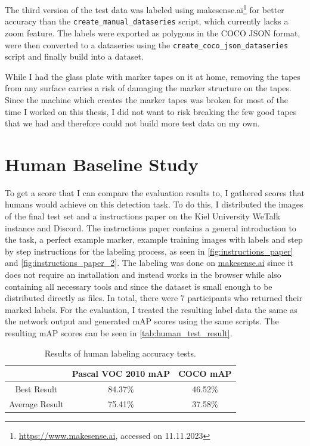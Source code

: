 \documentclass[10pt]{book}
\newcommand{\figureref}[1]{\autoref{#1}}
\begin{document}
The third version of the test data was labeled using makesense.ai\footnote{\url{https://www.makesense.ai}, accessed on 11.11.2023} for better accuracy than the \texttt{create\_manual\_dataseries} script, which currently lacks a zoom feature. The labels were exported as polygons in the \ac{COCO} \ac{JSON} format, were then converted to a dataseries using the \texttt{create\_coco\_json\_dataseries} script and finally build into a dataset.

While I had the glass plate with marker tapes on it at home, removing the tapes from any surface carries a risk of damaging the marker structure on the tapes. Since the machine which creates the marker tapes was broken for most of the time I worked on this thesis, I did not want to risk breaking the few good tapes that we had and therefore could not build more test data on my own.

\section{Human Baseline Study}

To get a score that I can compare the evaluation results to, I gathered scores that humans would achieve on this detection task. To do this, I distributed the images of the final test set and a instructions paper on the Kiel University WeTalk instance and Discord. The instructions paper contains a general introduction to the task, a perfect example marker, example training images with labels and step by step instructions for the labeling process, as seen in \figureref{fig:instructions_paper} and \figureref{fig:instructions_paper_2}. The labeling was done on \href{https://www.makesense.ai}{makesense.ai} since it does not require an installation and instead works in the browser while also containing all necessary tools and since the dataset is small enough to be distributed directly as files. In total, there were 7 participants who returned their marked labels. For the evaluation, I treated the resulting label data the same as the network output and generated \ac{mAP} scores using the same scripts. The resulting \ac{mAP} scores can be seen in \autoref{tab:human_test_result}.

\begin{table}
  \begin{tabular}{ c c c }
   & Pascal VOC 2010 \ac{mAP} & \ac{COCO} \ac{mAP} \\ 
   \hline
   Best Result & 84.37\% & 46.52\% \\
   Average Result & 75.41\% & 37.58\% \\
   \hline
  \end{tabular}
  \caption{\label{tab:human_test_result}Results of human labeling accuracy tests.}
\end{table}
\end{document}
